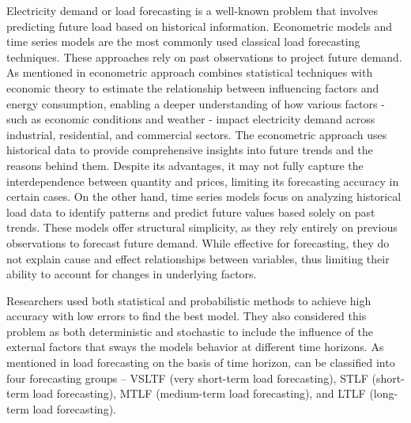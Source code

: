 \documentclass[mstat,12pt]{unswthesis}
\begin{document}
Electricity demand or load forecasting is a well-known problem that
involves predicting future load based on historical information.
Econometric models and time series models are the most commonly used
classical load forecasting techniques. These approaches rely on past
observations to project future demand. As mentioned in \cite{9812604}
econometric approach combines statistical techniques with economic
theory to estimate the relationship between influencing factors and
energy consumption, enabling a deeper understanding of how various
factors - such as economic conditions and weather - impact electricity
demand across industrial, residential, and commercial sectors. The
econometric approach uses historical data to provide comprehensive
insights into future trends and the reasons behind them. Despite its
advantages, it may not fully capture the interdependence between
quantity and prices, limiting its forecasting accuracy in certain cases.
On the other hand, time series models focus on analyzing historical load
data to identify patterns and predict future values based solely on past
trends. These models offer structural simplicity, as they rely entirely
on previous observations to forecast future demand. While effective for
forecasting, they do not explain cause and effect relationships between
variables, thus limiting their ability to account for changes in
underlying factors.

\bigskip

Researchers used both statistical and probabilistic methods to achieve
high accuracy with low errors to find the best model. They also
considered this problem as both deterministic and stochastic to include
the influence of the external factors that sways the models behavior at
different time horizons. As mentioned in \cite{9812604} load forecasting
on the basis of time horizon, can be classified into four forecasting
groups -- VSLTF (very short-term load forecasting), STLF (short-term
load forecasting), MTLF (medium-term load forecasting), and LTLF
(long-term load forecasting).
\end{document}
